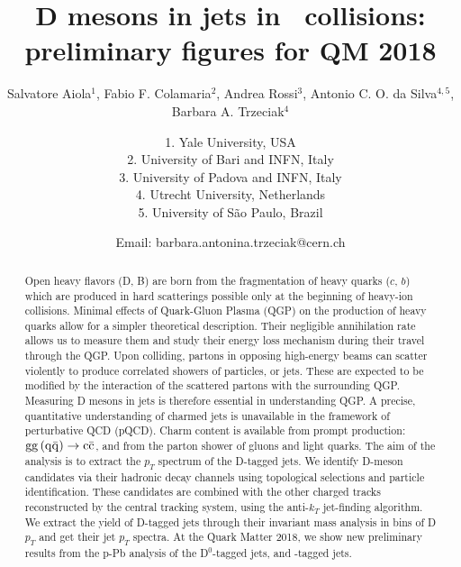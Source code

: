 \documentclass[ALICE,manyauthors]{ALICE_analysis_notes}
\begin{document}
%
%
%
\begin{titlepage}
%
\PHdate{\today}
%
\title{D mesons in jets in \pPb\ collisions: preliminary figures for QM 2018}
%
\author{Salvatore Aiola$^{1}$, Fabio F. Colamaria$^{2}$, Andrea Rossi$^{3}$, Antonio C. O. da Silva$^{4,5}$, Barbara A. Trzeciak$^{4}$}
\author{
1. Yale University, USA\\
2. University of Bari and INFN, Italy\\
3. University of Padova and INFN, Italy\\
4. Utrecht University, Netherlands\\
5. University of S\~ao Paulo, Brazil\\
}
\author{Email: barbara.antonina.trzeciak@cern.ch}
%
%
\begin{abstract}
Open heavy flavors (D, B) are born from the fragmentation of heavy quarks ($c$, $b$) which are produced in hard scatterings 
possible only at the beginning of heavy-ion collisions. Minimal effects of Quark-Gluon Plasma (QGP) on the production of heavy 
quarks allow for a simpler theoretical description. Their negligible annihilation rate allows us to measure them and study their energy loss mechanism during their travel through the QGP. 
Upon colliding, partons in opposing high-energy beams can scatter violently to produce correlated showers of particles, or jets. 
These are expected to be modified by the interaction of the scattered partons with the surrounding QGP. Measuring D mesons in jets is therefore essential in understanding QGP.
A precise, quantitative understanding of charmed jets is unavailable in the framework of perturbative QCD (pQCD). Charm 
content is available from prompt production: ${\rm gg\, (q\bar{q})} \rightarrow {\rm c\bar{c}}$, 
and from the parton shower of gluons and light quarks. 
The aim of the analysis is to extract the $p_T$ spectrum of the D-tagged jets. 
We identify D-meson candidates via their hadronic decay channels using topological selections and particle identification. These 
candidates are combined with the other charged tracks reconstructed by the central tracking system, using the anti-$k_T$ jet-finding algorithm. 
We extract the yield of D-tagged jets through their invariant mass analysis in bins of D $p_T$ and get their jet $p_T$ spectra.  
At the Quark Matter 2018, we show new preliminary results from the p-Pb analysis of the D$^0$-tagged jets, and \Dstar-tagged jets.
\end{abstract}
\end{titlepage}
%
\tableofcontents
\newpage
\end{document}
